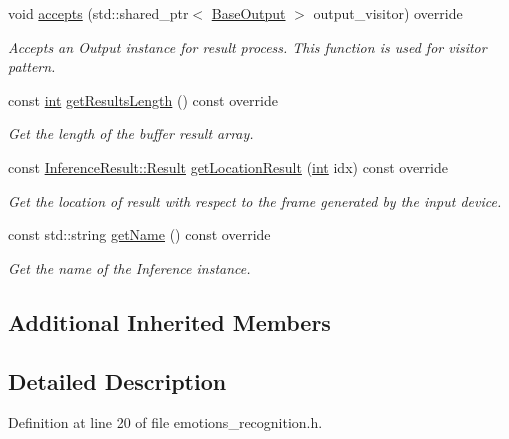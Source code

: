 \begin{DoxyCompactItemize}
void \hyperlink{classopenvino__service_1_1EmotionsDetection_ad3b3e5f68943041161b02f4c56de763e}{accepts} (std\+::shared\+\_\+ptr$<$ \hyperlink{classBaseOutput}{Base\+Output} $>$ output\+\_\+visitor) override
\begin{DoxyCompactList}\small\item\em Accepts an Output instance for result process. This function is used for visitor pattern. \end{DoxyCompactList}\item 
const \hyperlink{CMakeCache_8txt_a79a3d8790b2588b09777910863574e09}{int} \hyperlink{classopenvino__service_1_1EmotionsDetection_ac240dcf338a9e7b4da78597be5219266}{get\+Results\+Length} () const override
\begin{DoxyCompactList}\small\item\em Get the length of the buffer result array. \end{DoxyCompactList}\item 
const \hyperlink{structInferenceResult_1_1Result}{Inference\+Result\+::\+Result} \hyperlink{classopenvino__service_1_1EmotionsDetection_a4b235a72ba45667a2e8a54ea595ce22c}{get\+Location\+Result} (\hyperlink{CMakeCache_8txt_a79a3d8790b2588b09777910863574e09}{int} idx) const override
\begin{DoxyCompactList}\small\item\em Get the location of result with respect to the frame generated by the input device. \end{DoxyCompactList}\item 
const std\+::string \hyperlink{classopenvino__service_1_1EmotionsDetection_a676e7c587ce0bc41de50f8da60642bd6}{get\+Name} () const override
\begin{DoxyCompactList}\small\item\em Get the name of the Inference instance. \end{DoxyCompactList}\end{DoxyCompactItemize}
\subsection*{Additional Inherited Members}


\subsection{Detailed Description}


Definition at line 20 of file emotions\+\_\+recognition.\+h.



